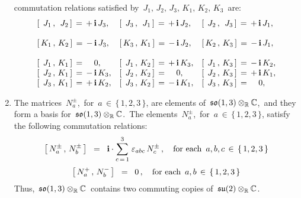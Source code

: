 \begin{corollary}
\begin{enumerate}
	commutation relations satisfied by
	\,$J_{1},\, J_{2},\, J_{3},\, K_{1},\, K_{2},\, K_{3}$\,
	are:
	\begin{equation*}
	\begin{array}{lll}
	\left[\,\;J_{1}\,,\,\;J_{2}\,\right] \,=\, + \, \i \, J_{3}, &
	\left[\,\;J_{3}\,,\,\;J_{1}\,\right] \,=\, + \, \i \, J_{2}, &
	\left[\,\;J_{2}\,,\,\;J_{3}\,\right] \,=\, + \, \i \, J_{1},
	\\ \\
	\left[\,K_{1}\,,\,K_{2}\,\right] \,=\, - \, \i \, J_{3}, &
	\left[\,K_{3}\,,\,K_{1}\,\right] \,=\, - \, \i \, J_{2}, &
	\left[\,K_{2}\,,\,K_{3}\,\right] \,=\, - \, \i \, J_{1},
	\\ \\
	\left[\,\;J_{1}\,,\,K_{1}\,\right] \,=\, {\color{white}-}\,0,\;\;\;\; &
	\left[\,\;J_{1}\,,\,K_{2}\,\right] \,=\, + \, \i \, K_{3}, &
	\left[\,\;J_{1}\,,\,K_{3}\,\right] \,=\, - \, \i \, K_{2},
	\\
	\left[\,\;J_{2}\,,\,K_{1}\,\right] \,=\, - \, \i \, K_{3}, &
	\left[\,\;J_{2}\,,\,K_{2}\,\right] \,=\, {\color{white}-}\,0,\;\;\;\; &
	\left[\,\;J_{2}\,,\,K_{3}\,\right] \,=\, + \, \i \, K_{1},
	\\
	\left[\,\;J_{3}\,,\,K_{1}\,\right] \,=\, + \, \i \, K_{2}, &
	\left[\,\;J_{3}\,,\,K_{2}\,\right] \,=\, - \, \i \, K_{1}, &
	\left[\,\;J_{3}\,,\,K_{3}\,\right] \,=\, {\color{white}-}\,0,\;\;\;\;
	\end{array}
	\end{equation*}
\item
	The matrices
	\,$N^{\pm}_{a}$,\, for \,$a \,\in\, \{\,1,2,3\,\}$,
	are elements of
	\,$\mathfrak{so}(1,3) \otimes_{\mathbb{R}} \mathbb{C}$,\, and they form a basis for \,$\mathfrak{so}(1,3) \otimes_{\mathbb{R}} \mathbb{C}$.\,
	The elements
	\,$N^{\pm}_{a}$,\, for \,$a \,\in\, \{\,1,2,3\,\}$,
	satisfy the following commutation relations:
	\begin{equation*}
	\left[\,N^{\pm}_{a}\,,\,N^{\pm}_{b}\,\right]
	\;\;=\;\;
		\textnormal{\bf i} \cdot \overset{3}{\underset{c\,=\,1}{\sum}} \;\varepsilon_{abc} \, N^{\pm}_{c}\,,
	\quad
	\textnormal{for each \,$a, b, c \,\in\, \{\,1, 2, 3\,\}$}
	\end{equation*}
	\begin{equation*}
	\left[\,N^{+}_{a}\,,\,N^{-}_{b}\,\right] \;\;=\;\; 0\,,
	\quad
	\textnormal{for each \,$a, b \,\in\, \{\,1, 2, 3\,\}$}
	\end{equation*}
	Thus,
	\,$\mathfrak{so}(1,3) \otimes_{\mathbb{R}} \mathbb{C}$\,
	contains two commuting copies of
	\,$\mathfrak{su}(2) \otimes_{\mathbb{R}} \mathbb{C}$.\,
\end{enumerate}
\end{corollary}

